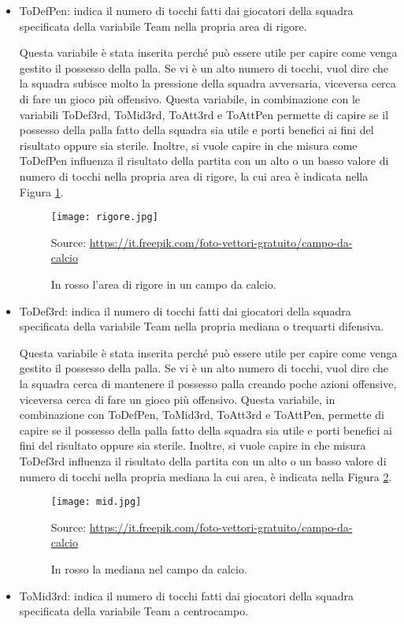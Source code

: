 \begin{itemize}
	\item \textsf{ToDefPen}: indica il numero di tocchi fatti dai giocatori della squadra specificata della variabile \textsf{Team} nella propria area di rigore. 
	
	Questa variabile è stata inserita perché può essere utile per capire come venga gestito il possesso della palla. Se vi è un alto numero di tocchi, vuol dire che la squadra subisce molto la pressione della squadra avversaria, viceversa cerca di fare un gioco più offensivo. Questa variabile, in combinazione con le variabili \textsf{ToDef3rd}, \textsf{ToMid3rd}, \textsf{ToAtt3rd} e \textsf{ToAttPen} permette di capire se il possesso della palla fatto della squadra sia utile e porti benefici ai fini del risultato oppure sia sterile. Inoltre, si vuole capire in che misura come \textsf{ToDefPen} influenza il risultato della partita con un alto o un basso valore di numero di tocchi nella propria area di rigore, la cui area è indicata nella Figura \ref{fig:penalty}.
	
	\begin{figure}[!ht]
		\begin{center}
			\texttt{[image: rigore.jpg]}
			\caption{In rosso l'area di rigore in un campo da calcio.}
			Source: \url{https://it.freepik.com/foto-vettori-gratuito/campo-da-calcio} 
			\label{fig:penalty}
		\end{center}
	\end{figure}
	
	
	\item \textsf{ToDef3rd}: indica il numero di tocchi fatti dai giocatori della squadra specificata della variabile \textsf{Team} nella propria mediana o trequarti difensiva. 
	
	Questa variabile è stata inserita perché può essere utile per capire come venga gestito il possesso della palla. Se vi è un alto numero di tocchi, vuol dire che la squadra cerca di mantenere il possesso palla creando poche azioni offensive, viceversa cerca di fare un gioco più offensivo. Questa variabile, in combinazione con \textsf{ToDefPen}, \textsf{ToMid3rd}, \textsf{ToAtt3rd} e \textsf{ToAttPen}, permette di capire se il possesso della palla fatto della squadra sia utile e porti benefici ai fini del risultato oppure sia sterile. Inoltre, si vuole capire in che misura \textsf{ToDef3rd} influenza il risultato della partita con un alto o un basso valore di numero di tocchi nella propria mediana la cui area, è indicata nella Figura \ref{fig:def}.
	
	\begin{figure}[!ht]
		\begin{center}
			\texttt{[image: mid.jpg]}
			\caption{In rosso la mediana nel campo da calcio.} 
			Source: \url{https://it.freepik.com/foto-vettori-gratuito/campo-da-calcio} 
			\label{fig:def}
		\end{center}
	\end{figure}
	\item \textsf{ToMid3rd}: indica il numero di tocchi fatti dai giocatori della squadra specificata della variabile \textsf{Team} a centrocampo. 
	

\end{itemize}
